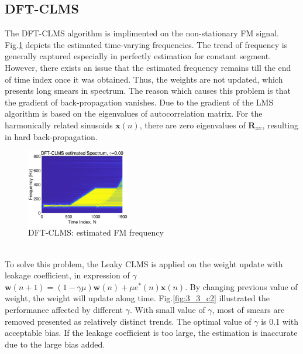 \subsection{DFT-CLMS}
The DFT-CLMS algorithm is implimented on the non-stationary FM signal. Fig.\ref{fig:3_3_c1} depicts the estimated time-varying frequencies. The trend of frequency is generally captured especially in perfectly estimation for constant segment. However, there exists an issue that the estimated frequency remains till the end of time index once it was obtained. Thus, the weights are not updated, which presents long smears in spectrum. The reason which causes this problem is that the gradient of back-propagation vanishes. Due to the gradient of the LMS algorithm is based on the eigenvalues of autocorrelation matrix. For the harmonically related sinusoids $\mathbf x(n)$, there are zero eigenvalues of $\mathbf R_{xx}$, resulting in hard back-propagation. 
\begin{figure}[htb]
     \centering
     \includegraphics[width=0.4\textwidth]{fig/33/33c1.eps}
     \caption{DFT-CLMS: estimated FM frequency}
     \label{fig:3_3_c1}
\end{figure}\\
To solve this problem, the Leaky CLMS is applied on the weight update with leakage coefficient, in expression of $\gamma$ $\mathbf{w}(n+1)=(1-\gamma\mu)\mathbf{w}(n)+\mu e^*(n)\mathbf x(n)$. By changing previous value of weight, the weight will update along time. Fig.\ref{fig:3_3_c2} illustrated the performance affected by different $\gamma$. With small value of $\gamma$, most of smears are removed presented as relatively distinct trends. The optimal value of $\gamma$ is 0.1 with acceptable bias. If the leakage coefficient is too large, the estimation is inaccurate due to the large bias added.
